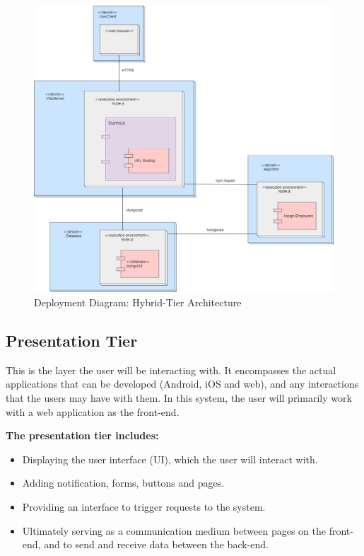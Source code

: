 \documentclass[]{article}
\begin{document}
\begin{adjustwidth}{2.5em}{0pt}
\begin{flushleft}
				 	\begin{figure}[h]
					 	\centering
				    	\includegraphics[width=0.56\linewidth]{Diagrams/deployment.png}
					 	\caption{Deployment Diagram: Hybrid-Tier Architecture}
					 	\label{fig:Deployment}
				 	\end{figure}
			\end{flushleft}
		
			\subsection*{Presentation Tier}
			\begin{flushleft}
			This is the layer the user will be interacting with. It encompasses the actual applications that can be developed (Android, iOS and web), and any interactions that the users may have with them. In this system, the user will primarily work with a web application as the front-end.
			\newline 
			
			\textbf{The presentation tier includes:}
			\begin{itemize}
				\item Displaying the user interface (UI), which the user will interact with. 
				\item Adding notification, forms, buttons and pages. 
				\item Providing an interface to trigger requests to the system. 
				\item Ultimately serving as a communication medium between pages on the front-end, and to send and receive data between the back-end.
			\end{itemize}
			\end{flushleft}
	

\end{adjustwidth}
\end{document}
